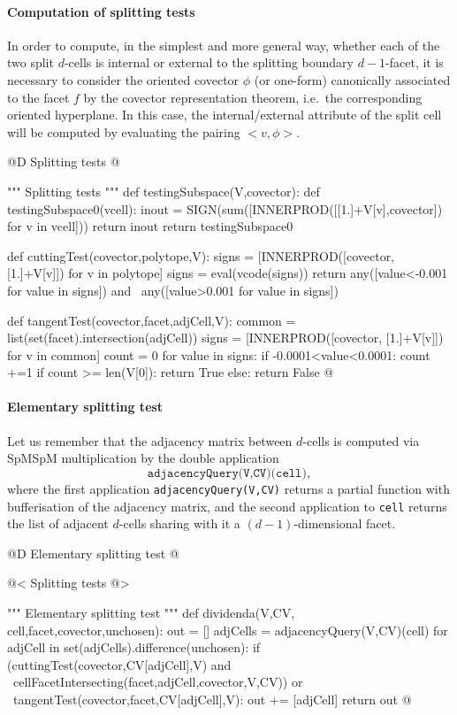 \documentclass[11pt,oneside]{article}	%
\begin{document}
\paragraph{Computation of splitting tests}

In order to compute, in the simplest and more general way, whether each of the two split $d$-cells is internal or external to the splitting boundary $d-1$-facet, it is necessary to consider the oriented covector $\phi$ (or one-form) canonically associated to the facet $f$ by the covector representation theorem, i.e.~the corresponding oriented hyperplane. In this case, the internal/external attribute of the split cell will be computed by evaluating the pairing $<v,\phi>$.

@D Splitting tests
@{""" Splitting tests """
def testingSubspace(V,covector):
	def testingSubspace0(vcell):
		inout = SIGN(sum([INNERPROD([[1.]+V[v],covector]) for v in vcell]))
		return inout
	return testingSubspace0
	
def cuttingTest(covector,polytope,V):
	signs = [INNERPROD([covector, [1.]+V[v]]) for v in polytope]
	signs = eval(vcode(signs))
	return any([value<-0.001 for value in signs]) and \
			any([value>0.001 for value in signs])
	
def tangentTest(covector,facet,adjCell,V):
	common = list(set(facet).intersection(adjCell))
	signs = [INNERPROD([covector, [1.]+V[v]]) for v in common]
	count = 0
	for value in signs:
		if -0.0001<value<0.0001: count +=1
	if count >= len(V[0]): 
		return True
	else: 
		return False	
@}




\paragraph{Elementary splitting test}

Let us remember that the adjacency matrix between $d$-cells is computed via SpMSpM multiplication by the double application 
\[
\texttt{adjacencyQuery(V,CV)(cell)}, 
\] 
where the first application \texttt{adjacencyQuery(V,CV)}
returns a partial function with bufferisation of the adjacency matrix, and the second application to \texttt{cell} returns the list of adjacent $d$-cells sharing with it a $(d-1)$-dimensional facet.

@D Elementary splitting test
@{
@< Splitting tests @>

""" Elementary splitting test """
def dividenda(V,CV, cell,facet,covector,unchosen):
	out = []
	adjCells = adjacencyQuery(V,CV)(cell)
	for adjCell in set(adjCells).difference(unchosen):
		if (cuttingTest(covector,CV[adjCell],V) and \
			cellFacetIntersecting(facet,adjCell,covector,V,CV)) or \
			tangentTest(covector,facet,CV[adjCell],V): out += [adjCell]
	return out
@}
\end{document}
